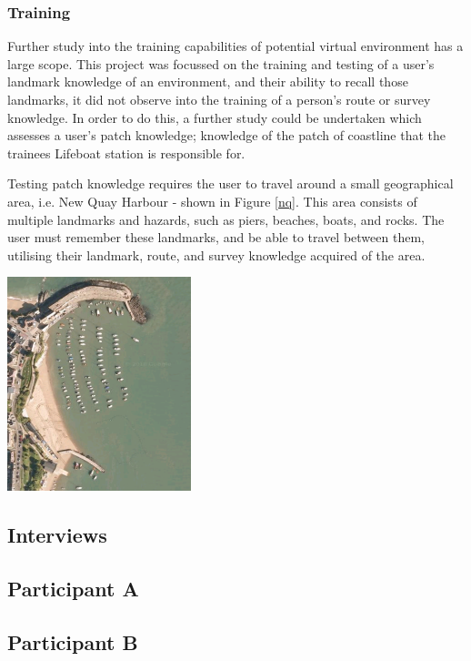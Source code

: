 \documentclass[ %
                    author={Elis Jones},
                supervisor={Dr. Kirsten Cater},
                    degree={BSc},
                     title={The Effect of Presentation Medium on Spatial Cognition},
                  subtitle={in the Virtual Environment},
                      year={2018} ]{dissertation}
\begin{document}
\subsection{Training}
Further study into the training capabilities of potential virtual environment has a large scope. This project was focussed on the training and testing of a user's landmark knowledge of an environment, and their ability to recall those landmarks, it did not observe into the training of a person's route or survey knowledge. In order to do this, a further study could be undertaken which assesses a user's patch knowledge; knowledge of the patch of coastline that the trainees Lifeboat station is responsible for.

Testing patch knowledge requires the user to travel around a small geographical area, i.e. New Quay Harbour - shown in Figure \ref{nq}. This area consists of multiple landmarks and hazards, such as piers, beaches, boats, and rocks. The user must remember these landmarks, and be able to travel between them, utilising their landmark, route, and survey knowledge acquired of the area. 

\begin{minipage}{\textwidth}
\hfill \break
\centering
\includegraphics[width=0.4\textwidth]{images/new_quay}
\label{nq}
\hfill \break
\end{minipage}

\backmatter

\begin{appendices}
\chapter{Interviews}
\section{Participant A}
\section{Participant B}
\end{appendices}

\clearpage


\end{document}
